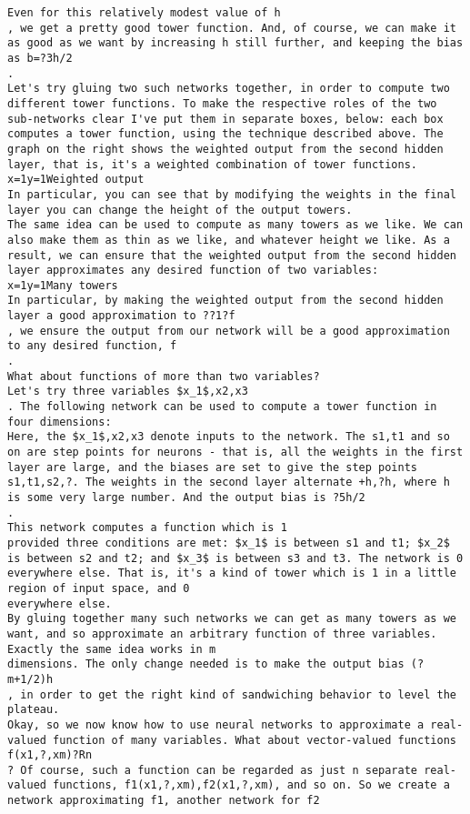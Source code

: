 \begin{lstlisting}
Even for this relatively modest value of h
, we get a pretty good tower function. And, of course, we can make it as good as we want by increasing h still further, and keeping the bias as b=?3h/2
.
Let's try gluing two such networks together, in order to compute two different tower functions. To make the respective roles of the two sub-networks clear I've put them in separate boxes, below: each box computes a tower function, using the technique described above. The graph on the right shows the weighted output from the second hidden layer, that is, it's a weighted combination of tower functions.
x=1y=1Weighted output
In particular, you can see that by modifying the weights in the final layer you can change the height of the output towers.
The same idea can be used to compute as many towers as we like. We can also make them as thin as we like, and whatever height we like. As a result, we can ensure that the weighted output from the second hidden layer approximates any desired function of two variables:
x=1y=1Many towers 
In particular, by making the weighted output from the second hidden layer a good approximation to ??1?f
, we ensure the output from our network will be a good approximation to any desired function, f
.
What about functions of more than two variables?
Let's try three variables $x_1$,x2,x3
. The following network can be used to compute a tower function in four dimensions:
Here, the $x_1$,x2,x3 denote inputs to the network. The s1,t1 and so on are step points for neurons - that is, all the weights in the first layer are large, and the biases are set to give the step points s1,t1,s2,?. The weights in the second layer alternate +h,?h, where h is some very large number. And the output bias is ?5h/2
.
This network computes a function which is 1
provided three conditions are met: $x_1$ is between s1 and t1; $x_2$ is between s2 and t2; and $x_3$ is between s3 and t3. The network is 0 everywhere else. That is, it's a kind of tower which is 1 in a little region of input space, and 0
everywhere else.
By gluing together many such networks we can get as many towers as we want, and so approximate an arbitrary function of three variables. Exactly the same idea works in m
dimensions. The only change needed is to make the output bias (?m+1/2)h
, in order to get the right kind of sandwiching behavior to level the plateau.
Okay, so we now know how to use neural networks to approximate a real-valued function of many variables. What about vector-valued functions f(x1,?,xm)?Rn
? Of course, such a function can be regarded as just n separate real-valued functions, f1(x1,?,xm),f2(x1,?,xm), and so on. So we create a network approximating f1, another network for f2

\end{lstlisting}
